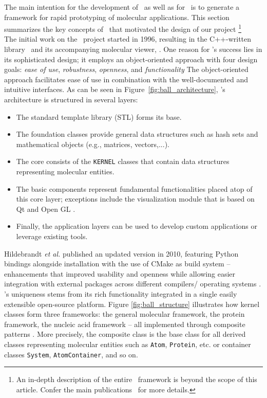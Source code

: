 The main intention for the development of \ball\ as well as for \biochem\ is to generate a framework for rapid prototyping of molecular applications. This section summarizes the key concepts of \ball\ that motivated the design of our project \footnote{An in-depth description of the entire \ball\ framework is beyond the scope of this article. Confer the main publications~\cite{kohlbacher_ballrapid_2000, hildebrandt_ball_2010}  for more details.}\\
The initial work on the \ball\ project started in 1996, resulting in the C++-written library \ball\ and its accompanying molecular viewer, \textit{\ballview}. One reason for \ball's success lies in its sophisticated design; it employs an object-oriented approach with four design goals: \textit{ease of use}, \textit{robustness}, \textit{openness}, and \textit{functionality }
The object-oriented approach facilitates ease of use in combination with the well-documented and intuitive interfaces. As can be seen in Figure~\ref{fig:ball_architecture}, \ball's architecture is structured in several layers:
\begin{itemize}
	
	\item The standard template library (STL) forms its base.
	\item The foundation classes provide general data structures such as hash sets and mathematical objects (e.g., matrices, vectors,...). 
	\item The core consists of the \texttt{KERNEL} classes that contain data structures representing molecular entities.
	
	\item  The basic components represent fundamental functionalities placed atop of this core layer; exceptions include the visualization module that is based on Qt and Open GL \cite{Qt5,OpenGLWebsite}.
	\item Finally, the application layers can be used to develop custom applications or leverage existing tools. \\
\end{itemize}
Hildebrandt \textit{et al.} published an updated version in 2010, featuring  Python bindings alongside installation with the use of CMake as build system -- enhancements that improved usability and openness while allowing easier integration with external packages across different compilers/ operating systems \cite{hildebrandt_ball_2010}. \\

\ball's uniqueness stems from its rich functionality integrated in a single easily extensible open-source platform. Figure \ref{fig:ball_structure} illustrates how kernel classes form three frameworks: the general molecular framework, the protein framework, the nucleic acid framework -- all implemented through composite patterns \cite{gamma1994design}. More precisely, the composite class is the base class for all derived classes representing molecular entities such as \texttt{Atom}, \texttt{Protein}, etc. or container classes \texttt{System}, \texttt{AtomContainer}, and so on. \\ 

